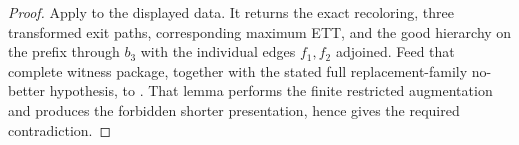 \begin{proof}
Apply  to the displayed data.
It returns the exact recoloring, three transformed exit paths, corresponding
maximum ETT, and the good hierarchy on the prefix through $b_3$ with the
individual edges $f_1,f_2$ adjoined.  Feed that complete witness package,
together with the stated full replacement-family no-better hypothesis, to
.  That lemma performs
the finite restricted augmentation and produces the forbidden shorter
presentation, hence gives the required contradiction.
\end{proof}
